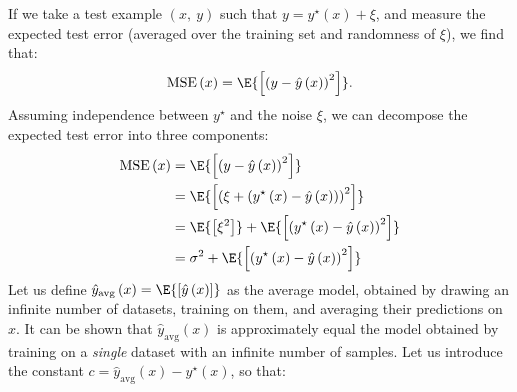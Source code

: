 \documentclass{article}
\begin{document}
If we take a test example \(\left( x,\: y \right)\) such that \(y =
y^\star\left( x \right) + \xi\), and measure the expected test error
(averaged over the training set and randomness of \(\xi\)), we find
that:
\begin{equation*}
    \mathrm{MSE}\left( x \right) = \E{\left[ {\left( y - \hat{y}\left( x \right) \right)}^2 \right]}.
\end{equation*}
Assuming independence between \(y^\star\) and the noise \(\xi\), we can
decompose the expected test error into three components:
\begin{align*}
    \mathrm{MSE}\left( x \right) & = \E{\left[ {\left( y - \hat{y}\left( x \right) \right)}^2 \right]}                                                  \\
                                 & = \E{\left[ {\left( \xi + \left( y^\star\left( x \right) - \hat{y}\left( x \right) \right) \right)}^2 \right]}       \\
                                 & = \E{\left[ \xi^2 \right]} + \E{\left[ {\left( y^\star\left( x \right) - \hat{y}\left( x \right) \right)}^2 \right]} \\
                                 & = \sigma^2 + \E{\left[ {\left( y^\star\left( x \right) - \hat{y}\left( x \right) \right)}^2 \right]}
\end{align*}
Let us define \(\hat{y}_{\mathrm{avg}}\left( x \right) =
\E{\left[ \hat{y}\left( x \right) \right]}\) as the average model,
obtained by drawing an infinite number of datasets, training on them,
and averaging their predictions on \(x\). It can be shown that
\(\hat{y}_{\mathrm{avg}}\left( x \right)\) is approximately equal the
model obtained by training on a \textit{single} dataset with an infinite
number of samples. Let us introduce the constant \(c = \hat{y}_{\mathrm{avg}}\left( x \right) - y^\star\left( x \right)\),
so that:
\end{document}
